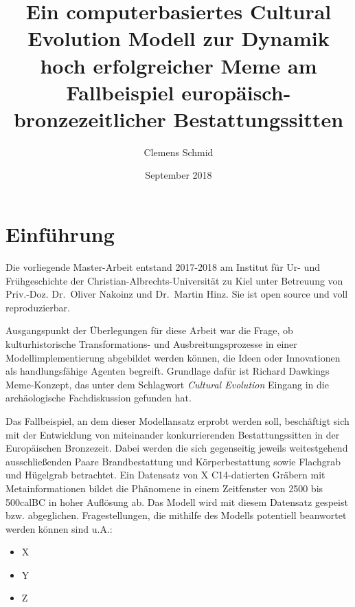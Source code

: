 \documentclass[openany,twoside,twocolumn]{book}
\title{Ein computerbasiertes Cultural Evolution Modell zur Dynamik hoch
erfolgreicher Meme am Fallbeispiel europäisch-bronzezeitlicher
Bestattungssitten}
\author{Clemens Schmid}
\date{September 2018}
\providecommand{\tightlist}{%
  \setlength{\itemsep}{0pt}\setlength{\parskip}{0pt}}
\begin{document}
\maketitle

\renewcommand{\chaptermark}[1]{\markboth{#1}{}}
\renewcommand{\sectionmark}[1]{\markright{\thesection\ #1}}
\fancyhf{}
\fancyhead[LE,RO]{\textbf{\thepage}}
\fancyhead[LO]{\textbf{\nouppercase{\rightmark}}}
\fancyhead[RE]{\textbf{\nouppercase{\leftmark}}}

\setcounter{tocdepth}{3}
\tableofcontents
\listoftables
\listoffigures

\parskip 4pt \setlength{\textfloatsep}{10pt plus 1.0pt minus 2.0pt}

\hypertarget{intro}{%
\chapter{Einführung}\label{intro}}

Die vorliegende Master-Arbeit entstand 2017-2018 am Institut für Ur- und
Frühgeschichte der Christian-Albrechts-Universität zu Kiel unter
Betreuung von Priv.-Doz. Dr.~Oliver Nakoinz und Dr.~Martin Hinz. Sie ist
open source und voll reproduzierbar.

Ausgangspunkt der Überlegungen für diese Arbeit war die Frage, ob
kulturhistorische Transformations- und Ausbreitungsprozesse in einer
Modellimplementierung abgebildet werden können, die Ideen oder
Innovationen als handlungsfähige Agenten begreift. Grundlage dafür ist
Richard Dawkings Meme-Konzept, das unter dem Schlagwort \emph{Cultural
Evolution} Eingang in die archäologische Fachdiskussion gefunden hat.

Das Fallbeispiel, an dem dieser Modellansatz erprobt werden soll,
beschäftigt sich mit der Entwicklung von miteinander konkurrierenden
Bestattungssitten in der Europäischen Bronzezeit. Dabei werden die sich
gegenseitig jeweils weitestgehend ausschließenden Paare Brandbestattung
und Körperbestattung sowie Flachgrab und Hügelgrab betrachtet. Ein
Datensatz von X C14-datierten Gräbern mit Metainformationen bildet die
Phänomene in einem Zeitfenster von 2500 bis 500calBC in hoher Auflösung
ab. Das Modell wird mit diesem Datensatz gespeist bzw. abgeglichen.
Fragestellungen, die mithilfe des Modells potentiell beanwortet werden
können sind u.A.:

\begin{itemize}
\tightlist
\item
  X
\item
  Y
\item
  Z
\end{itemize}
\end{document}
